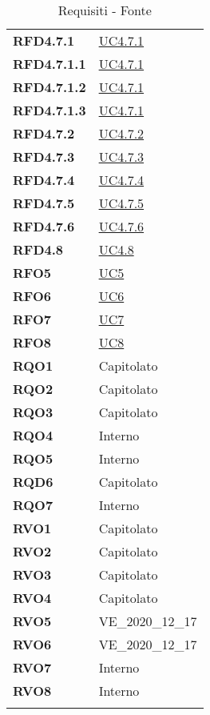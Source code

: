 \begin{longtable}[H]{|>{\centering\bfseries}m{8cm} | >{\centering\arraybackslash}m{8cm} |}
    RFD4.7.1 & \hyperref[par:uc4.7.1]{UC4.7.1} \\
    RFD4.7.1.1 & \hyperref[par:uc4.7.1]{UC4.7.1} \\
    RFD4.7.1.2 & \hyperref[par:uc4.7.1]{UC4.7.1} \\
    RFD4.7.1.3 & \hyperref[par:uc4.7.1]{UC4.7.1} \\
    RFD4.7.2 & \hyperref[par:uc4.7.2]{UC4.7.2} \\
    RFD4.7.3 & \hyperref[par:uc4.7.3]{UC4.7.3} \\
    RFD4.7.4 & \hyperref[par:uc4.7.4]{UC4.7.4} \\
    RFD4.7.5 & \hyperref[spar:uc4.7.5]{UC4.7.5} \\
    RFD4.7.6 & \hyperref[spar:uc4.7.6]{UC4.7.6} \\
    RFD4.8 & \hyperref[ssub:uc4.8]{UC4.8} \\
    RFO5 & \hyperref[sub:uc5]{UC5} \\
    RFO6 & \hyperref[sub:uc6]{UC6} \\
    RFO7 & \hyperref[sub:uc7]{UC7} \\
    RFO8 & \hyperref[sub:uc8]{UC8} \\
    RQO1 & Capitolato \\
    RQO2 & Capitolato \\
    RQO3 & Capitolato \\
    RQO4 & Interno \\
    RQO5 & Interno \\
    RQD6 & Capitolato \\
    RQO7 & Interno \\
    RVO1 & Capitolato \\
    RVO2 & Capitolato \\
    RVO3 & Capitolato \\
    RVO4 & Capitolato \\
    RVO5 & \textsc{VE\_2020\_12\_17} \\
    RVO6 & \textsc{VE\_2020\_12\_17} \\
    RVO7 & Interno \\
    RVO8 & Interno \\
    
    \hline
    \rowcolor{white}
    \caption{Requisiti - Fonte}%
    \label{tab:requisiti_fonte}
\end{longtable}
